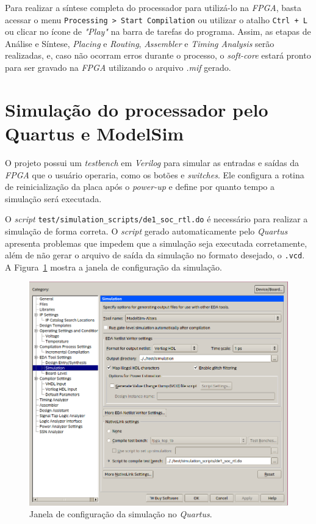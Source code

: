     { Para realizar a síntese completa do processador para utilizá-lo na \textit{FPGA},
        basta acessar o menu \texttt{Processing > Start Compilation} ou utilizar
        o atalho \texttt{Ctrl + L} ou clicar no ícone de \textit{"Play"}
        na barra de tarefas do programa. Assim, as etapas de Análise e Síntese,
        \textit{Placing} e \textit{Routing}, \textit{Assembler} e
        \textit{Timing Analysis} serão realizadas, e, caso não ocorram erros
        durante o processo, o \textit{soft-core} estará pronto para ser
        gravado na \textit{FPGA} utilizando o arquivo \textit{.mif} gerado.
    }


\section{Simulação do processador pelo Quartus e ModelSim}
    { O projeto possui um \textit{testbench} em \textit{Verilog} para simular as
        entradas e saídas da \textit{FPGA} que o usuário operaria, como os botões
        e \textit{switches}. Ele configura a rotina de reinicialização da placa
        após o \textit{power-up} e define por quanto tempo a simulação será
        executada.
    }

    { O \textit{script} \texttt{test/simulation\_scripts/de1\_soc\_rtl.do} é
        necessário para realizar a simulação de forma correta. O \textit{script}
        gerado automaticamente pelo \textit{Quartus} apresenta problemas que
        impedem que a simulação seja executada corretamente, além de não gerar
        o arquivo de saída da simulação no formato desejado, o \texttt{.vcd}.
        A Figura~\ref{fig:quartus_simulation_config} mostra a janela de configuração
        da simulação.
    }

    \begin{figure}[H]
    \centering
        \includegraphics[width=.65\linewidth]{../images/quartus/simulation_config.png}
        \caption{Janela de configuração da simulação no \textit{Quartus}.}
        \label{fig:quartus_simulation_config}
    \end{figure}

